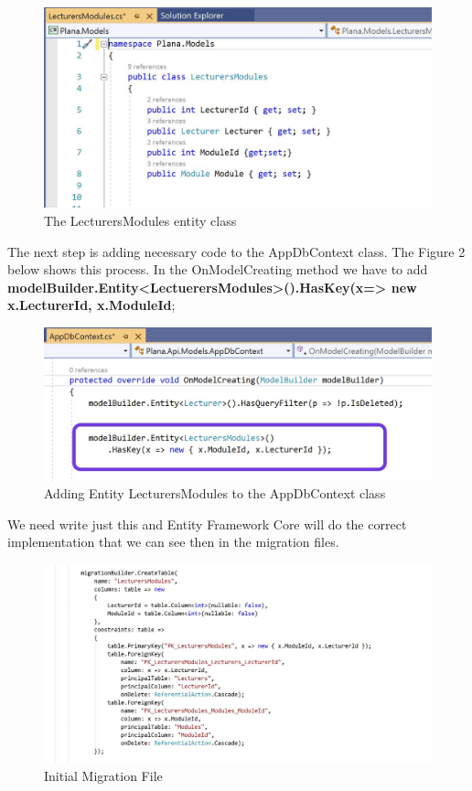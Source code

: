 \documentclass{scrartcl}
\begin{document}
\begin{figure}[H]
\centering
\includegraphics[width=150mm]{report_img/lecturers-modules.JPG}
\caption{The LecturersModules entity class}
\label{blabla}
\end{figure}

 The next step  is adding necessary code to the AppDbContext class.
The Figure 2 below shows this process. In the OnModelCreating method we have to add \textbf{modelBuilder.Entity<LectuerersModules>().HasKey(x=> new {x.LecturerId, x.ModuleId}};\\





\begin{figure}[H]
\centering
\includegraphics[width=150mm]{report_img/many-to-many.JPG}
\caption{Adding Entity LecturersModules to the AppDbContext class}
\label{blabla}
\end{figure}  
We need write just this and Entity Framework Core will do the correct implementation that we can see then in the migration files. \cite{patrick}

\begin{figure}[H]
\centering
\includegraphics[width=150mm]{report_img/Initial.JPG}
\caption{Initial Migration File}
\label{blabla}
\end{figure} 
\end{document}
